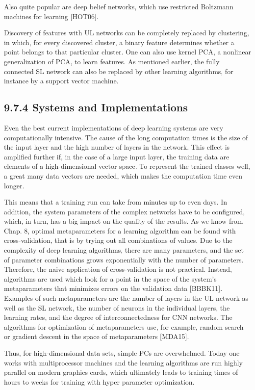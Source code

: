 \documentclass[10pt]{article}
\begin{document}
Also quite popular are deep belief networks, which use restricted Boltzmann machines for learning [HOT06].

Discovery of features with UL networks can be completely replaced by clustering, in which, for every discovered cluster, a binary feature determines whether a point belongs to that particular cluster. One can also use kernel PCA, a nonlinear generalization of PCA, to learn features. As mentioned earlier, the fully connected SL network can also be replaced by other learning algorithms, for instance by a support vector machine.

\subsection*{9.7.4 Systems and Implementations}
Even the best current implementations of deep learning systems are very computationally intensive. The cause of the long computation times is the size of the input layer and the high number of layers in the network. This effect is amplified further if, in the case of a large input layer, the training data are elements of a high-dimensional vector space. To represent the trained classes well, a great many data vectors are needed, which makes the computation time even longer.

This means that a training run can take from minutes up to even days. In addition, the system parameters of the complex networks have to be configured, which, in turn, has a big impact on the quality of the results. As we 
know from Chap. 8, optimal metaparameters for a learning algorithm can be found with cross-validation, that is by trying out all combinations of values. Due to the complexity of deep learning algorithms, there are many parameters, and the set of parameter combinations grows exponentially with the number of parameters. Therefore, the naive application of cross-validation is not practical. Instead, algorithms are used which look for a point in the space of the system's metaparameters that minimizes errors on the validation data [BBBK11]. Examples of such metaparameters are the number of layers in the UL network as well as the SL network, the number of neurons in the individual layers, the learning rates, and the degree of interconnectedness for CNN networks. The algorithms for optimization of metaparameters use, for example, random search or gradient descent in the space of metaparameters [MDA15].

Thus, for high-dimensional data sets, simple PCs are overwhelmed. Today one works with multiprocessor machines and the learning algorithms are run highly parallel on modern graphics cards, which ultimately leads to training times of hours to weeks for training with hyper parameter optimization.
\end{document}
